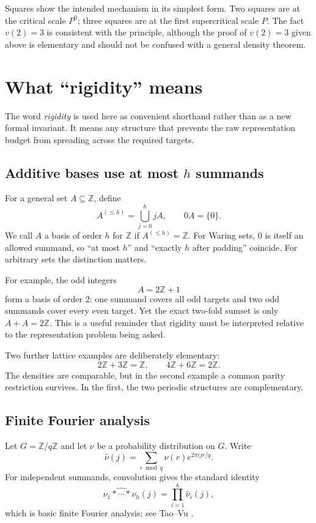 \documentclass[../Axiomathic.tex]{subfiles}
\newcommand{\Z}{\mathbb Z}
\begin{document}
Squares show the intended mechanism in its simplest form.  Two squares are at the critical scale $P^0$; three squares are at the first supercritical scale $P$.  The fact $v(2)=3$ is consistent with the principle, although the proof of $v(2)=3$ given above is elementary and should not be confused with a general density theorem.

\section{What ``rigidity'' means}

The word \emph{rigidity} is used here as convenient shorthand rather than as a new formal invariant.  It means any structure that prevents the raw representation budget from spreading across the required targets.

\subsection{Additive bases use at most $h$ summands}

For a general set $A\subseteq\Z$, define
\[
  A^{(\le h)}=\bigcup_{j=0}^{h}jA,
  \qquad 0A=\{0\}.
\]
We call $A$ a basis of order $h$ for $\Z$ if $A^{(\le h)}=\Z$.  For Waring sets, $0$ is itself an allowed summand, so ``at most $h$'' and ``exactly $h$ after padding'' coincide.  For arbitrary sets the distinction matters.

For example, the odd integers
\[
  A=2\Z+1
\]
form a basis of order $2$: one summand covers all odd targets and two odd summands cover every even target.  Yet the exact two-fold sumset is only $A+A=2\Z$.  This is a useful reminder that rigidity must be interpreted relative to the representation problem being asked.

Two further lattice examples are deliberately elementary:
\[
  2\Z+3\Z=\Z,
  \qquad
  4\Z+6\Z=2\Z.
\]
The densities are comparable, but in the second example a common parity restriction survives.  In the first, the two periodic structures are complementary.

\subsection{Finite Fourier analysis}

Let $G=\Z/q\Z$ and let $\nu$ be a probability distribution on $G$.  Write
\[
  \widehat\nu(j)=\sum_{r\bmod q}\nu(r)e^{2\pi ijr/q}.
\]
For independent summands, convolution gives the standard identity
\begin{equation}\label{eq:fourier-conv}
  \widehat{\nu_1*\cdots*\nu_h}(j)
  =\prod_{i=1}^{h}\widehat\nu_i(j),
\end{equation}
which is basic finite Fourier analysis; see Tao--Vu \cite[Ch.~4]{TaoVu2006}.
\end{document}
